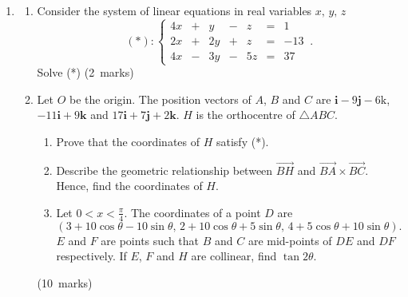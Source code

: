 \documentclass[12pt, a4paper]{article} %
\newcommand{\qmarks}[1]{\leavevmode\unskip\hspace*{\fill}\mbox{(#1 marks)}}
\begin{document}
\begin{enumerate}
    \item \begin{enumerate}
        \item Consider the system of linear equations in real variables \(x,\,y,\,z\)
        \[
        (*): \left\{
        \begin{array}{ccccccc}
             4x & + & y & - & z & = & 1 \\
            2x & + & 2y & + & z & = & -13 \\
            4x & -  & 3y  & - &  5z & = & 37
        \end{array}
        \right. \,.
        \]
        Solve (*) \qmarks{2}
        \item Let \(O\) be the origin. The position vectors of \(A\), \(B\) and \(C\) are \(\mathbf{i}-9\mathbf{j}-6\mathrm{k}\), \(-11\mathbf{i}+9\mathbf{k}\) and \(17\mathbf{i}+7\mathbf{j}+2\mathbf{k}\). \(H\) is the orthocentre of \(\triangle ABC\).
        \begin{enumerate}[label=(\roman*)]
            \item Prove that the coordinates of \(H\) satisfy (*).
            \item Describe the geometric relationship between \(\overrightarrow{BH}\) and \(\overrightarrow{BA}\times\overrightarrow{BC}\). Hence, find the coordinates of \(H\).
            \item Let \(\displaystyle 0<x<\frac{\pi}{4}\). The coordinates of a point \(D\) are
            \[(3+10\cos\theta-10\sin\theta, \,2+10\cos\theta+5\sin\theta,\,4+5\cos\theta+10\sin\theta).\]
            \(E\) and \(F\) are points such that \(B\) and \(C\) are mid-points of \(DE\) and \(DF\) respectively. If \(E\), \(F\) and \(H\) are collinear, find \(\tan{2\theta}\).
        \end{enumerate}\qmarks{10}
    \end{enumerate}


\end{enumerate}
\end{document}
